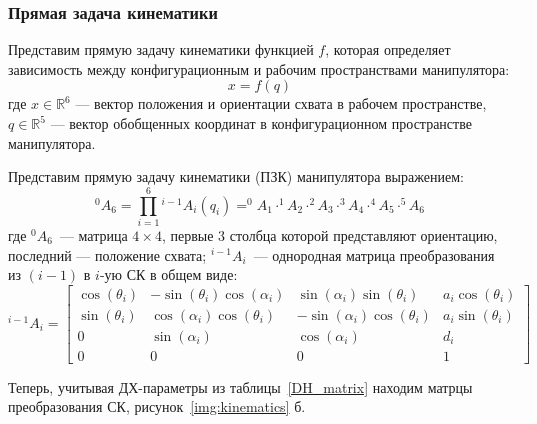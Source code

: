 \subsubsection{Прямая задача кинематики}\label{part_kinematics_forward}

Представим прямую задачу кинематики функцией $f$, которая определяет зависимость между  конфигурационным и рабочим пространствами манипулятора:
\begin{equation}
	x = f(q)
\end{equation}
где $x \in \mathbb{R}^6$ --- вектор положения и ориентации схвата в рабочем пространстве, $q \in \mathbb{R}^5$ --- вектор обобщенных координат в конфигурационном пространстве манипулятора.
\fi

Представим прямую задачу кинематики (ПЗК) манипулятора выражением:
\begin{equation}\label{fk}
	^0A_6 = \prod^{6}_{i=1}{^{i-1}A_i(q_i)} = ^0A_1 \cdot ^1A_2 \cdot ^2A_3 \cdot ^3A_4 \cdot ^4A_5 \cdot ^5A_6
\end{equation}
где $^0A_6$~--- матрица $4 \times 4$, первые $3$ столбца которой представляют ориентацию, последний --- положение схвата; $^{i-1}A_i$~--- однородная матрица преобразования из $(i-1)$ в $i$-ую СК в общем виде:
\begin{equation}
	^{i-1}A_i = 
	\left[\begin{matrix}
	\cos{\left (\theta_i \right )} & - \sin{\left (\theta_i \right )} \cos{\left (\alpha_i \right )} & \sin{\left (\alpha_i \right )} \sin{\left (\theta_i \right )} & a_{i} \cos{\left (\theta_i \right )}\\
	\sin{\left (\theta_i \right )} & \cos{\left (\alpha_i \right )} \cos{\left (\theta_i \right )} & - \sin{\left (\alpha_i \right )} \cos{\left (\theta_i \right )} & a_{i} \sin{\left (\theta_i \right )}\\
	0 & \sin{\left (\alpha_i \right )} & \cos{\left (\alpha_i \right )} & d_{i}\\
	0 & 0 & 0 & 1
	\end{matrix}\right]
\end{equation}

Теперь, учитывая ДХ-параметры из таблицы~\ref{DH_matrix} находим матрцы преобразования СК, рисунок~\ref{img:kinematics} б.

